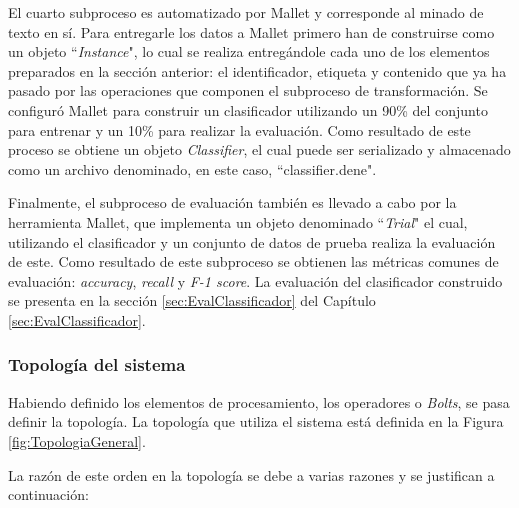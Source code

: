 El cuarto subproceso es automatizado por Mallet y corresponde al minado de texto en sí. Para entregarle los datos a Mallet primero han de construirse como un objeto ``\textit{Instance}", lo cual se realiza entregándole cada uno de los elementos preparados en la sección anterior: el identificador, etiqueta y contenido que ya ha pasado por las operaciones que componen el subproceso de transformación. Se configuró Mallet para construir un clasificador utilizando un 90\% del conjunto para entrenar y un 10\% para realizar la evaluación. Como resultado de este proceso se obtiene un objeto \textit{Classifier}, el cual puede ser serializado y almacenado como un archivo denominado, en este caso, ``classifier.dene". 

Finalmente, el subproceso de evaluación también es llevado a cabo por la herramienta Mallet, que implementa un objeto denominado ``\textit{Trial}" el cual, utilizando el clasificador y un conjunto de datos de prueba realiza la evaluación de este. Como resultado de este subproceso se obtienen las métricas comunes de evaluación: \textit{accuracy}, \textit{recall} y \textit{F-1 score}. La evaluación del clasificador construido se presenta en la sección \ref{sec:EvalClassificador} del Capítulo \ref{sec:EvalClassificador}. 

\subsubsection*{Topología del sistema}
\label{subsubsec:topologiaSistema}

Habiendo definido los elementos de procesamiento, los operadores o \textit{Bolts}, se pasa definir la topología. La topología que utiliza el sistema está definida en la Figura \ref{fig:TopologiaGeneral}.

La razón de este orden en la topología se debe a varias razones y se justifican a continuación:

